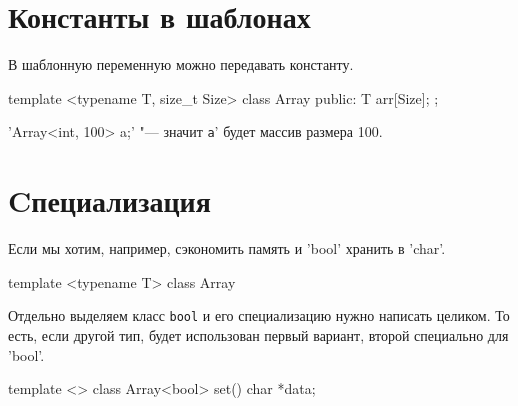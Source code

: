 \section{Константы в шаблонах}

В шаблонную переменную можно передавать константу. 

\begin{cppcode}
template <typename T, size_t Size>
class Array{
    public: 
        T arr[Size];
};
\end{cppcode}

\cpp'Array<int, 100> a;' "--- значит \verb'а'' будет массив размера 100.

\section{Cпециализация}

Если мы хотим, например, сэкономить память и \cpp'bool' хранить в \cpp'char'.

\begin{cppcode}
template <typename T>
class Array{ 

}
\end{cppcode}

Отдельно выделяем класс \verb'bool' и его специализацию нужно написать целиком.
То есть, если другой тип, будет использован первый вариант, второй специально для \cpp'bool'.

\begin{cppcode}
template <>
class Array<bool>{ 
    set(){
    }
    char *data;
}
\end{cppcode}
